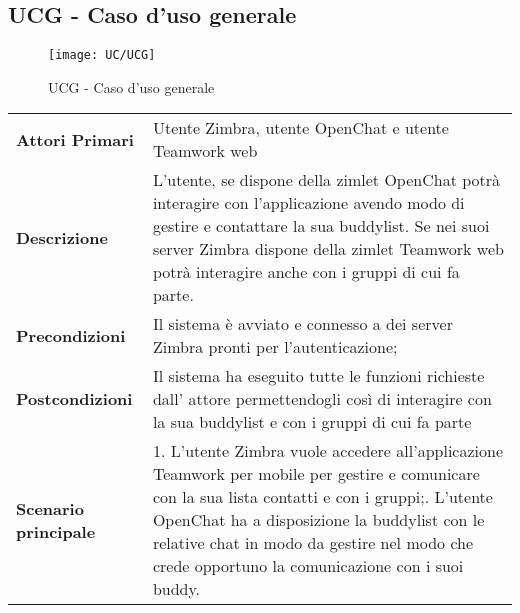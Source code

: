 \subsection{UCG - Caso d'uso generale}
	\begin{figure}[H] 
		\centering
		\texttt{[image: UC/UCG]}
		\caption{UCG - Caso d'uso generale}
	\end{figure}
	\begin{center}
	\bgroup
	\def\arraystretch{1.8}     
	\begin{longtable}{  p{4cm} | p{9.5cm} } 
		\textbf{Attori Primari} & Utente Zimbra, utente OpenChat e utente Teamwork web \\ 
		\textbf{Descrizione} & L'utente, se dispone della zimlet OpenChat potrà interagire con l'applicazione avendo modo di gestire e contattare la sua buddylist. Se nei suoi server Zimbra dispone della zimlet Teamwork web potrà interagire anche con i gruppi di cui fa parte. \\ 
		\textbf{Precondizioni}  & Il sistema è avviato e connesso a dei server Zimbra pronti per l'autenticazione; \\
		\textbf{Postcondizioni} & Il sistema ha eseguito tutte le funzioni richieste dall' attore permettendogli così di interagire con la sua buddylist e con i gruppi di cui fa parte  \\ 
		\textbf{Scenario principale} & 
		1. L’utente Zimbra vuole accedere all'applicazione Teamwork per mobile per gestire e comunicare con la sua lista contatti e con i gruppi;\newline
		2. L’utente OpenChat ha a disposizione la buddylist con le relative chat in modo da gestire nel modo che crede opportuno la comunicazione con i suoi buddy.
	\end{longtable}
	\egroup
\end{center}

